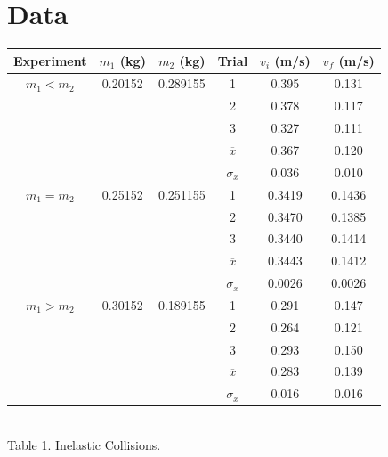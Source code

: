\documentclass[12pt]{article}
\begin{document}
    \section{Data}
        \begin{center}
            \begin{tabular}{ccc|ccc}
                Experiment & \(m_1\) (kg) & \(m_2\) (kg) & Trial & \(v_{i}\) (m/s) & \(v_{f}\) (m/s)\\
                \hline
                \(m_1 < m_2\) & 0.20152 & 0.289155 & 1 & 0.395 & 0.131 \\
                &&& 2 & 0.378 & 0.117\\
                &&& 3 & 0.327 & 0.111\\
                \cline{4-6}
                &&&\(\overline{x}\) & 0.367 & 0.120\\
                &&&\(\sigma_x\) & 0.036 & 0.010\\
                \hline
                \(m_1 = m_2\) & 0.25152 & 0.251155 & 1 & 0.3419 & 0.1436\\
                &&& 2 & 0.3470 & 0.1385\\
                &&& 3 & 0.3440 & 0.1414\\
                \cline{4-6}
                &&&\(\overline{x}\) & 0.3443 & 0.1412\\
                &&&\(\sigma_x\) & 0.0026 & 0.0026\\
                \hline
                \(m_1 > m_2\) & 0.30152 & 0.189155 & 1 & 0.291 & 0.147 \\
                &&& 2 & 0.264 & 0.121\\
                &&& 3 & 0.293 & 0.150\\
                \cline{4-6}
                &&&\(\overline{x}\) & 0.283 & 0.139\\
                &&&\(\sigma_x\) & 0.016 & 0.016\\
                \hline
            \end{tabular}\\[8pt]
            Table 1. Inelastic Collisions.\\
        \end{center}
\end{document}
